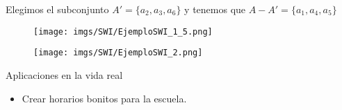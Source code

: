 \begin{frame}{\subsectiontitle}
    Elegimos el subconjunto $A'=\{a_2,a_3,a_6\}$ y tenemos que $A-A'=\{a_1,a_4,a_5\}$
    \begin{figure}
    \centering
        \texttt{[image: imgs/SWI/EjemploSWI\_1\_5.png]}
    \end{figure}
\end{frame}

\begin{frame}{\subsectiontitle}
    \begin{figure}
    \centering
        \texttt{[image: imgs/SWI/EjemploSWI\_2.png]}
    \end{figure}
\end{frame}

\begin{frame}{Aplicaciones en la vida real}
    \begin{itemize}
        \itemj Agendar las tareas que debe realizar una maquina.
        \item Crear horarios bonitos para la escuela.
    \end{itemize}
\end{frame}